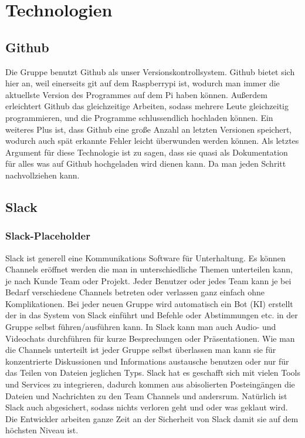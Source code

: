 \documentclass[notitlepage]{report}
\begin{document}
\section{Technologien}

\subsection{Github}

Die Gruppe benutzt Github als unser Versionskontrollsystem. Github bietet sich hier an, weil einerseits git auf dem Raspberrypi ist, wodurch man immer die aktuellste Version des Programmes auf dem Pi haben k\"{o}nnen. Au{\ss}erdem erleichtert Github das gleichzeitige Arbeiten, sodass mehrere Leute gleichzeitig programmieren, und die Programme schlussendlich hochladen k\"{o}nnen. Ein weiteres Plus ist, dass Github eine gro{\ss}e Anzahl an letzten Versionen speichert, wodurch auch sp\"{a}t erkannte Fehler leicht \"{u}berwunden werden k\"{o}nnen. Als letztes Argument f\"{u}r diese Technologie ist zu sagen, dass sie quasi als Dokumentation f\"{u}r alles was auf Github hochgeladen wird dienen kann. Da man jeden Schritt nachvollziehen kann. 

\subsection{Slack}

\subsubsection{Slack-Placeholder}

Slack ist generell eine Kommunikations Software f\"{u}r Unterhaltung. Es k\"{o}nnen Channels er\"{o}ffnet werden die man in unterschiedliche Themen unterteilen kann, je nach Kunde Team oder Projekt. Jeder Benutzer oder jedes Team kann je bei Bedarf verschiedene Channels betreten oder verlassen ganz einfach ohne Komplikationen. Bei jeder neuen Gruppe wird automatisch ein Bot (KI) erstellt der in das System von Slack einf\"{u}hrt und Befehle oder Abstimmungen etc. in der Gruppe selbst f\"{u}hren/ausf\"{u}hren kann. In Slack kann man auch Audio- und Videochats durchf\"{u}hren f\"{u}r kurze Besprechungen oder Pr\"{a}sentationen.  Wie man die Channels unterteilt ist jeder Gruppe selbst \"{u}berlassen man kann sie f\"{u}r konzentrierte Diskussionen und Informations austausche benutzen oder nur f\"{u}r das Teilen von Dateien jeglichen Typs. Slack hat es geschafft sich mit vielen Tools und Services zu integrieren, dadurch kommen aus abisolierten Posteing\"{a}ngen die Dateien und Nachrichten zu den Team Channels und andersrum. Nat\"{u}rlich ist Slack auch abgesichert, sodass nichts verloren geht und oder was geklaut wird. Die Entwickler arbeiten ganze Zeit an der Sicherheit von Slack damit sie auf dem h\"{o}chsten Niveau ist.
\end{document}

